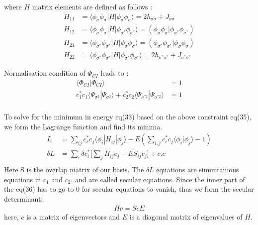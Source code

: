 \documentclass[11pt]{article}   	%
\begin{document}
	where $H$ matrix elements are defined as follows :\\
	\begin{equation}
	\begin{split}
		H_{11}&=\langle\phi_{\sigma}\phi_{\sigma}|H|\phi_{\sigma}\phi_{\sigma}\rangle=2 h_{\sigma\sigma}+J_{\sigma\sigma}\\
		H_{12}&=\langle\phi_{\sigma}\phi_{\sigma}|H|\phi_{\sigma^*}\phi_{\sigma^*}\rangle=(\phi_{\sigma}
		\phi_{\sigma}|\phi_{\sigma^*}\phi_{\sigma^*})\\
		H_{21}&=\langle\phi_{\sigma^*}\phi_{\sigma^*}|H|\phi_{\sigma}\phi_{\sigma}\rangle=(\phi_{\sigma^*}
		\phi_{\sigma^*}|\phi_{\sigma}\phi_{\sigma})\\
		H_{22}&=\langle\phi_{\sigma^*}\phi_{\sigma^*}|H|\phi_{\sigma^*}\phi_{\sigma^*}\rangle=2 h_
		{\sigma^*\sigma^*}+J_{\sigma^*\sigma^*}
	\end{split}
	\end{equation}


	Normalisation condition of $\Phi_{CI}$ leads to :\\
	\begin{equation}
	\begin{split}
		\langle\Phi_{CI}|\Phi_{CI}\rangle&=1\\
		c_1^*c_1\langle\Psi_{\sigma^2}|\Psi_{\sigma^2}\rangle+c_2^*c_2\langle\Psi_{\sigma^{*2}}|\Psi_{\sigma^{*2}}\rangle&=1\\
	\end{split}	
	\end{equation}
	
	To solve for the minimum in energy eq(33) based on the above constraint eq(35), we form the Lagrange function and
	 find its minima.  
	\begin{equation}
	\begin{split}
	L&=\sum_{ij}c_i^*c_j\langle\phi_i|H_{ij}|\phi_j\rangle-E(\sum_{i,j}c_i^*c_j\langle\phi_i|\phi_j\rangle-1)\\
	\delta L&=\sum_i\delta c_i^*\big[\sum_j H_{ij}c_j-ES_{ij}c_j\big]+c.c\\
	\end{split}
	\end{equation}
	Here S is the overlap matrix of our basis. The $\delta L$ equations are simuntanious 
	equations in $c_1$ and $c_2$, and are called secular equations. Since the inner part of the 
	eq(36) has to go to 0 for secular equations to vanish, thus we form
	the secular determinant:\\
	\begin{equation}
	\begin{split}
		Hc=ScE
	\end{split}
	\end{equation}
	here, $c$ is a matrix of eigenvectors and $E$ is a diagonal matrix of eigenvalues of $H$.\\
\end{document}

